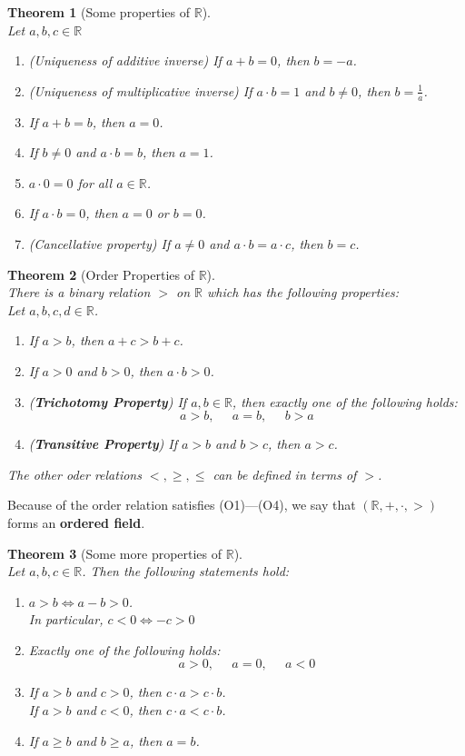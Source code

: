 \documentclass[8pt]{article}
\newtheorem{theorem}{Theorem}[section]
\theoremstyle{definition}
\begin{document}
\begin{theorem}[Some properties of $\mathbb{R}$]
\hfill\\
\normalfont Let $a,b,c\in\mathbb{R}$
\begin{enumerate}[label=(\roman*)]
\item (\textit{Uniqueness of additive inverse}) If $a+b=0$, then $b=-a$.
\item (\textit{Uniqueness of multiplicative inverse}) If $a\cdot b = 1$ and $b\neq 0$, then $b=\frac{1}{a}$.
\item If $a+b=b$, then $a = 0$.
\item If $b\neq 0$ and $a\cdot b = b$, then $a = 1$.
\item $a\cdot 0 = 0$ for all $a\in\mathbb{R}$.
\item If $a\cdot b = 0$, then $a = 0$ or $b = 0$.
\item (\textit{Cancellative property}) If $a\neq 0$ and $a\cdot b = a\cdot c$, then $b = c$.
\end{enumerate}
\end{theorem}
\begin{theorem}[Order Properties of $\mathbb{R}$]
\hfill\\
\normalfont There is a binary relation $>$ on $\mathbb{R}$ which has the following properties:\\Let $a,b,c,d\in\mathbb{R}$.
\begin{enumerate}[label=(O\arabic*)]
\item If $a>b$, then $a+c>b+c$.
\item If $a>0$ and $b>0$, then $a\cdot b>0$.
\item (\textbf{Trichotomy Property}) If $a,b\in\mathbb{R}$, then exactly one of the following holds:
\[
a>b,\;\;\;\;\; a=b,\;\;\;\;\;b>a
\]
\item (\textbf{Transitive Property}) If $a>b$ and $b>c$, then $a>c$.
\end{enumerate}
The other oder relations $<,\geq,\leq$ can be defined in terms of $>$.
\end{theorem}
Because of the order relation satisfies (O1)---(O4), we say that $(\mathbb{R},+,\cdot,>)$ forms an \textbf{ordered field}.
\begin{theorem}[Some more properties of $\mathbb{R}$]
\hfill\\
\normalfont Let $a,b,c\in\mathbb{R}$. Then the following statements hold:
\begin{enumerate}[label=(\roman*)]
\item $a>b\Leftrightarrow a-b>0$. \\In particular, $c<0 \Leftrightarrow -c>0$
\item Exactly one of the following holds:
\[
a>0,\;\;\;\;\;a=0,\;\;\;\;\;a<0
\]
\item If $a>b$ and $c>0$, then $c\cdot a>c\cdot b$. \\If $a>b$ and $c<0$, then $c\cdot a<c\cdot b$.
\item If $a\geq b$ and $b\geq a$, then $a=b$.
\end{enumerate}
\end{theorem}
\end{document}

